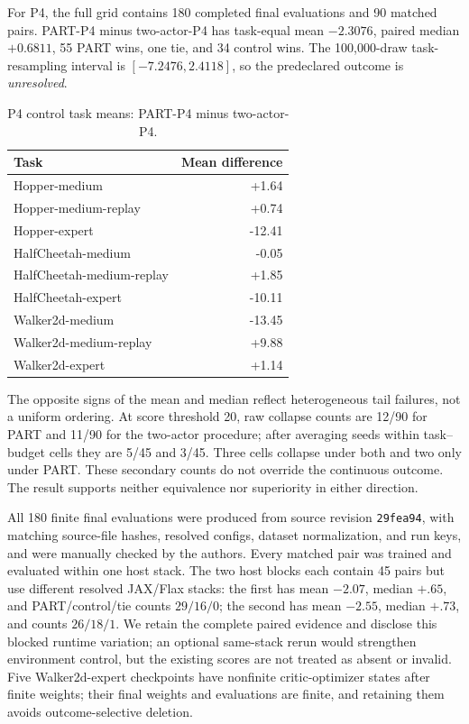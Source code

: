 \documentclass[twoside]{article}
\begin{document}
For P4, the full grid contains 180 completed final evaluations and 90 matched
pairs. PART-P4 minus two-actor-P4 has task-equal mean $-2.3076$, paired median
$+0.6811$, 55 PART wins, one tie, and 34 control wins. The 100,000-draw
task-resampling interval is $[-7.2476,2.4118]$, so the predeclared outcome is
\emph{unresolved}.

\begin{table}[t]
\caption{P4 control task means: PART-P4 minus two-actor-P4.}
\centering
\small
\begin{tabular}{lr}
\toprule
Task & Mean difference\\
\midrule
Hopper-medium & +1.64\\
Hopper-medium-replay & +0.74\\
Hopper-expert & -12.41\\
HalfCheetah-medium & -0.05\\
HalfCheetah-medium-replay & +1.85\\
HalfCheetah-expert & -10.11\\
Walker2d-medium & -13.45\\
Walker2d-medium-replay & +9.88\\
Walker2d-expert & +1.14\\
\bottomrule
\end{tabular}
\label{tab:p4_separation_control}
\end{table}

The opposite signs of the mean and median reflect heterogeneous tail failures,
not a uniform ordering. At score threshold 20, raw collapse counts are 12/90
for PART and 11/90 for the two-actor procedure; after averaging seeds within
task--budget cells they are 5/45 and 3/45. Three cells collapse under both and
two only under PART. These secondary counts do not override the continuous
outcome. The result supports neither equivalence nor superiority in either
direction.

All 180 finite final evaluations were produced from source revision
\texttt{29fea94}, with matching source-file hashes, resolved configs, dataset
normalization, and run keys, and were manually checked by the authors. Every
matched pair was trained and evaluated within one host stack. The two host
blocks each contain 45 pairs but use different resolved JAX/Flax stacks:
the first has mean $-2.07$, median $+.65$, and PART/control/tie counts
$29/16/0$; the second has mean $-2.55$, median $+.73$, and counts $26/18/1$.
We retain the complete paired evidence and disclose this blocked runtime
variation; an optional same-stack rerun would strengthen environment control,
but the existing scores are not treated as absent or invalid. Five
Walker2d-expert checkpoints have nonfinite critic-optimizer states after finite
weights; their final weights and evaluations are finite, and retaining them
avoids outcome-selective deletion.
\end{document}
